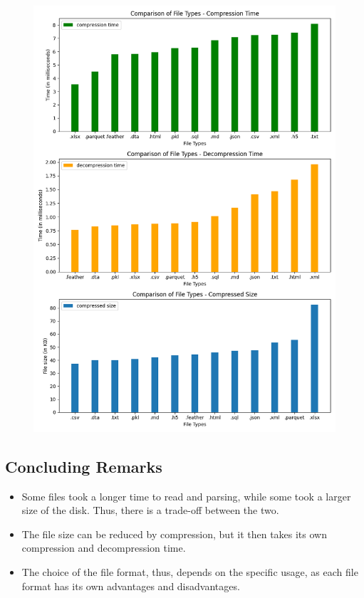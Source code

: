 \documentclass[11pt]{article}
\begin{document}
\begin{figure}[H]
  \centering
  \includegraphics[width=1\textwidth]{SBIN_compress.png}
\end{figure}

\subsection{Concluding Remarks}

\begin{itemize}
    \item Some files took a longer time to read and parsing, while some took a larger size of the disk. Thus, there is a trade-off between the two.
    \item The file size can be reduced by compression, but it then takes its own compression and decompression time.
    \item The choice of the file format, thus, depends on the specific usage, as each file format has its own advantages and disadvantages.
\end{itemize}
\end{document}
